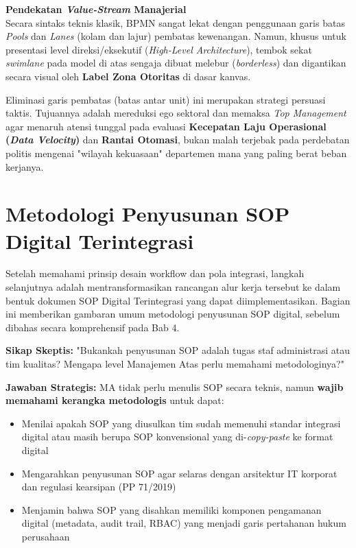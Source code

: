 \documentclass[12pt,a4paper]{report}
\begin{document}
\begin{plnbox}
\small
\textbf{Pendekatan \textit{Value-Stream} Manajerial} \\
Secara sintaks teknis klasik, BPMN sangat lekat dengan penggunaan garis batas \textit{Pools} dan \textit{Lanes} (kolam dan lajur) pembatas kewenangan. Namun, khusus untuk presentasi level direksi/eksekutif (\textit{High-Level Architecture}), tembok sekat \textit{swimlane} pada model di atas sengaja dibuat melebur (\textit{borderless}) dan digantikan secara visual oleh \textbf{Label Zona Otoritas} di dasar kanvas.

Eliminasi garis pembatas (batas antar unit) ini merupakan strategi persuasi taktis. Tujuannya adalah mereduksi ego sektoral dan memaksa \textit{Top Management} agar menaruh atensi tunggal pada evaluasi \textbf{Kecepatan Laju Operasional (\textit{Data Velocity})} dan \textbf{Rantai Otomasi}, bukan malah terjebak pada perdebatan politis mengenai "wilayah kekuasaan" departemen mana yang paling berat beban kerjanya.
\end{plnbox}

\section{Metodologi Penyusunan SOP Digital Terintegrasi}

Setelah memahami prinsip desain workflow dan pola integrasi, langkah selanjutnya adalah mentransformasikan rancangan alur kerja tersebut ke dalam bentuk dokumen SOP Digital Terintegrasi yang dapat diimplementasikan. Bagian ini memberikan gambaran umum metodologi penyusunan SOP digital, sebelum dibahas secara komprehensif pada Bab 4.

\begin{plnbox}
\small
\textbf{Sikap Skeptis:} "Bukankah penyusunan SOP adalah tugas staf administrasi atau tim kualitas? Mengapa level Manajemen Atas perlu memahami metodologinya?"

\textbf{Jawaban Strategis:} MA tidak perlu menulis SOP secara teknis, namun \textbf{wajib memahami kerangka metodologis} untuk dapat:
\begin{itemize}[nosep, leftmargin=*]
\item Menilai apakah SOP yang diusulkan tim sudah memenuhi standar integrasi digital atau masih berupa SOP konvensional yang di-\textit{copy-paste} ke format digital
\item Mengarahkan penyusunan SOP agar selaras dengan arsitektur IT korporat dan regulasi kearsipan (PP 71/2019)
\item Menjamin bahwa SOP yang disahkan memiliki komponen pengamanan digital (metadata, audit trail, RBAC) yang menjadi garis pertahanan hukum perusahaan
\end{itemize}
\end{plnbox}
\end{document}
